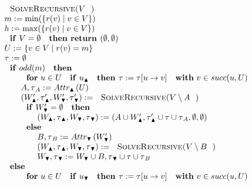 \begin{equation*}
\begin{array}{l}
\text{\textsc{SolveRecursive(}}V\text{\textsc{)}} \\ 
m:=\min (\{r(v)\mid v\in V\}) \\ 
h:=\max (\{r(v)\mid v\in V\}) \\ 
\text{\textbf{if} }V=\emptyset \text{ \textbf{then return }}(\emptyset
,\emptyset ) \\ 
U:=\{v\in V\mid r(v)=m\} \\ 
\tau :=\emptyset  \\ 
\text{\textbf{if} }odd(m)\text{ \textbf{then}} \\ 
\qquad \text{\textbf{for} }u\in U\text{ \textbf{if} }u_{\blacktriangle }%
\text{ \textbf{then }}\tau :=\tau \lbrack u\rightarrow v]\text{ \textbf{with}
}v\in succ(u,U) \\ 
\qquad A,\tau _{A}:=Attr_{\blacktriangle }\left( U\right)  \\ 
\qquad \left( W_{\blacktriangle }^{\prime },\tau _{\blacktriangle }^{\prime
},W_{\blacktriangledown }^{\prime },\tau _{\blacktriangledown }^{\prime
}\right) :=\text{\textsc{SolveRecursive(}}V\setminus A\text{)} \\ 
\qquad \text{\textbf{if} }W_{\blacktriangledown }^{\prime }=\emptyset \text{ 
\textbf{then}} \\ 
\qquad \qquad \left( W_{\blacktriangle },\tau _{\blacktriangle
},W_{\blacktriangledown },\tau _{\blacktriangledown }\right) :=\left( A\cup
W_{\blacktriangle }^{\prime },\tau _{\blacktriangle }^{\prime }\cup \tau
\cup \tau _{A},\emptyset ,\emptyset \right)  \\ 
\qquad \text{\textbf{else}} \\ 
\qquad \qquad B,\tau _{B}:=Attr_{\blacktriangledown }\left(
W_{\blacktriangledown }^{\prime }\right)  \\ 
\qquad \qquad \left( W_{\blacktriangle },\tau _{\blacktriangle
},W_{\blacktriangledown },\tau _{\blacktriangledown }\right) :=\text{\textsc{%
SolveRecursive(}}V\setminus B\text{)} \\ 
\qquad \qquad W_{\blacktriangledown },\tau _{\blacktriangledown
}:=W_{\blacktriangledown }\cup B,\tau _{\blacktriangledown }\cup \tau \cup
\tau _{B} \\ 
\text{\textbf{else}} \\ 
\qquad \text{\textbf{for} }u\in U\text{ \textbf{if} }u_{\blacktriangledown }%
\text{ \textbf{then }}\tau :=\tau \lbrack u\rightarrow v]\text{ \textbf{with}
}v\in succ(u,U) \\ 

\end{array}
\end{equation*}
